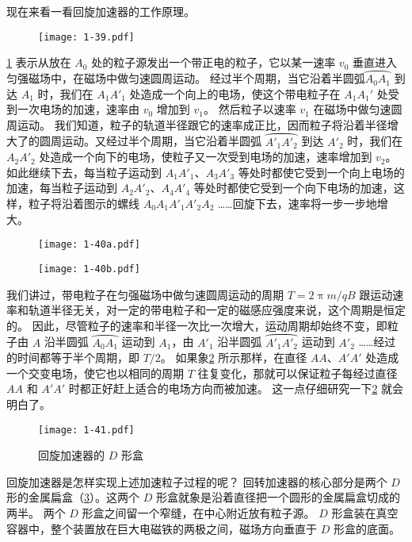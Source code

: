 现在来看一看回旋加速器的工作原理。
\begin{figure}
  \texttt{[image: 1-39.pdf]}
  \caption{}\label{fig:1-39}
\end{figure}

\cref{fig:1-39} 表示从放在 $A_0$ 处的粒子源发出一个带正电的粒子，它以某一速率 $v_0$ 垂直进入匀强磁场中，在磁场中做匀速圆周运动。
经过半个周期，当它沿着半圆弧$\overparen{A_0A_1}$ 到达 $A_1$ 时，我们在 $A_1A'_1$ 处造成一个向上的电场，使这个带电粒子在 $A_1A_1'$ 处受到一次电场的加速，速率由 $v_0$ 增加到 $v_1$。
然后粒子以速率 $v_1$ 在磁场中做匀速圆周运动。
我们知道，粒子的轨道半径跟它的速率成正比，因而粒子将沿着半径增大了的圆周运动。又经过半个周期，当它沿着半圆弧 $\overparen{A'_1A'_2}$ 到达 $A'_2$ 时，我们在 $A_2A'_2$ 处造成一个向下的电场，使粒子又一次受到电场的加速，速率增加到 $v_2$。
如此继续下去，每当粒子运动到 $A_1A'_1$、$A_3A'_3$ 等处时都使它受到一个向上电场的加速，每当粒子运动到 $A_2A'_2$、$A_4A'_4$ 等处时都使它受到一个向下电场的加速，这样，粒子将沿着图示的螺线 $A_0A_1A'_1A'_2A_2$ ……回旋下去，速率将一步一步地增大。
\begin{figure}
  \begin{minipage}[b]{0.48\linewidth}\centering
    \texttt{[image: 1-40a.pdf]}
    \label{fig:1-40a}
  \end{minipage}
  \begin{minipage}[b]{0.48\linewidth}\centering
    \texttt{[image: 1-40b.pdf]}
    \label{fig:1-40b}
  \end{minipage}
	\caption{}\label{fig:1-40}
\end{figure}

我们讲过，带电粒子在匀强磁场中做匀速圆周运动的周期 $T=2\uppi m/qB$ 跟运动速率和轨道半径无关，对一定的带电粒子和一定的磁感应强度来说，这个周期是恒定的。
因此，尽管粒子的速率和半径一次比一次增大，运动周期却始终不变，即粒子由 $A$ 沿半圆弧 $\overparen{A_0A_1}$ 运动到 $A_1$，由 $A'_1$ 沿半圆弧 $\overparen{A'_1A'_2}$ 运动到 $A'_2$ ……经过的时间都等于半个周期，即 $T/2$。
如果象\cref{fig:1-40} 所示那样，在直径 $AA$、$A'A'$ 处造成一个交变电场，使它也以相同的周期 $T$ 往复变化，那就可以保证粒子每经过直径 $AA$ 和 $A'A'$ 时都正好赶上适合的电场方向而被加速。
这一点仔细研究一下\cref{fig:1-40} 就会明白了。

\begin{figure}
  \texttt{[image: 1-41.pdf]}
  \caption{回旋加速器的 $D$ 形盒}\label{fig:1-41}
\end{figure}

回旋加速器是怎样实现上述加速粒子过程的呢？
回转加速器的核心部分是两个 $D$ 形的金属扁盒（\cref{fig:1-41}）。这两个 $D$ 形盒就象是沿着直径把一个圆形的金属扁盒切成的两半。
两个 $D$ 形盒之间留一个窄缝，在中心附近放有粒子源。
$D$ 形盒装在真空容器中，整个装置放在巨大电磁铁的两极之间，磁场方向垂直于 $D$ 形盒的底面。

